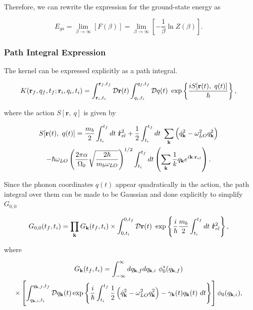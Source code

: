 Therefore, we can rewrite the expression for the ground-state energy as

\begin{equation}
    E_{gs} = \lim_{\beta \to \infty}\left[F(\beta) \right] = \lim_{\beta \to \infty} \left[-\frac{1}{\beta} \ln Z(\beta) \right].
\end{equation}

\subsubsection{Path Integral Expression}
\label{subsubsec:2-2-1-1}

The kernel can be expressed explicitly as a path integral.

\begin{equation}
    K(\vb{r}_f, q_f, t_f; \vb{r}_i, q_i, t_i) = \int_{\vb{r}_i, t_i}^{\vb{r}_f, t_f} \mathcal{D} \vb{r}(t) \int_{q_i, t_i}^{q_f, t_f} \mathcal{D}q(t)\ \exp\left\{{\frac{iS[\vb{r}(t),\ q(t)]}{\hbar}}\right\},
\end{equation}

where the action $S[\mathbf{r},\ q]$ is given by

\begin{equation}
\begin{gathered}
    S[\mathbf{r}(t),\ q(t)] = \frac{m_b}{2} \int_{t_i}^{t_f} dt\ \vb{\dot{r}}^2_{el} + \frac{1}{2} \int_{t_i}^{t_f} dt\ \sum_{\vb{k}} \left( \dot{q}_{\vb{k}}^2 - \omega_{LO}^2 q_{\vb{k}}^2 \right) \\
    - \hbar \omega_{LO} \left(\frac{2 \pi \alpha}{\Omega_0} \sqrt{\frac{2 \hbar}{m_b \omega_{LO}}}\right)^{1/2} \int_{t_i}^{t_f} dt \left( \sum_{\vb{k}} \frac{1}{k} q_{\vb{k}} e^{i \vb{k} \cdot \vb{r}_{el}} \right). 
\end{gathered}
\end{equation}

Since the phonon coordinates $q(t)$ appear quadratically in the action, the path integral over them can be made to be Gaussian and done explicitly to simplify $G_{0,0}$

\begin{equation}
    G_{0,0}(t_f, t_i) = \prod_{\vb{k}} G_{\vb{k}}(t_f, t_i) \times \int^{0, t_f}_{0, t_i} \mathcal{D}\vb{r}(t)\ \exp\left\{ \frac{i}{\hbar}  \frac{m_b}{2} \int^{t_f}_{t_i} dt\ \vb{\dot{r}}_{el}^2  \right\},
\end{equation}

where

\begin{equation}
\begin{gathered}
    G_{\vb{k}}(t_f, t_i) = \int_{-\infty}^{\infty} dq_{\vb{k}, f} dq_{\vb{k}, i}\ \phi_0^*(q_{\vb{k}, f}) \\
    \times \left[\int^{q_{\vb{k},f}, t_f}_{q_{\vb{k}, i}, t_i} \mathcal{D}q_{\vb{k}}(t) \exp \left\{\frac{i}{\hbar} \int_{t_i}^{t_f} \frac{1}{2}\left(\dot{q}_{\vb{k}}^2 - \omega_{LO}^2 q_{\vb{k}}^2 \right) - \gamma_{\vb{k}}(t) q_{\vb{k}}(t)\ dt \right\} \right] \phi_0(q_{\vb{k}, i}),
\end{gathered}
\end{equation}

